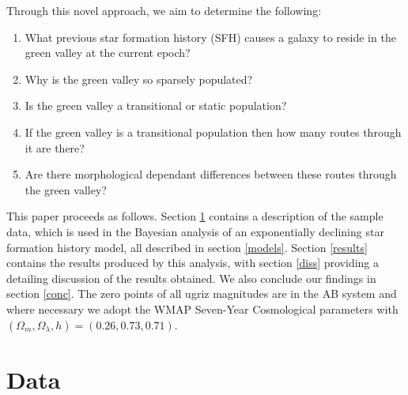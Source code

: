\documentclass{mn2e}
\begin{document}
Through this novel approach, we aim to determine the following:
\begin{enumerate}
\item What previous star formation history (SFH) causes a galaxy to reside in the green valley at the current epoch?
\item Why is the green valley so sparsely populated?
\item Is the green valley a transitional or static population? 
\item If the green valley is a transitional population then how many routes through it are there? 
\item Are there morphological dependant differences between these routes through the green valley? 
\end{enumerate}

This paper proceeds as follows. Section \ref{data} contains a description of the sample data, which is used in the Bayesian analysis of an exponentially declining star formation history model, all described in section \ref{models}. Section \ref{results} contains the results produced by this analysis, with section \ref{diss} providing a detailing discussion of the results obtained. We also conclude our findings in section \ref{conc}. The zero points of all ugriz magnitudes are in the AB system and where necessary we adopt the WMAP Seven-Year Cosmological parameters \citep{WMAP} with $(\Omega_m, \Omega_{\lambda}, h) = (0.26, 0.73, 0.71)$. 

\section{Data}\label{data}
\end{document}
